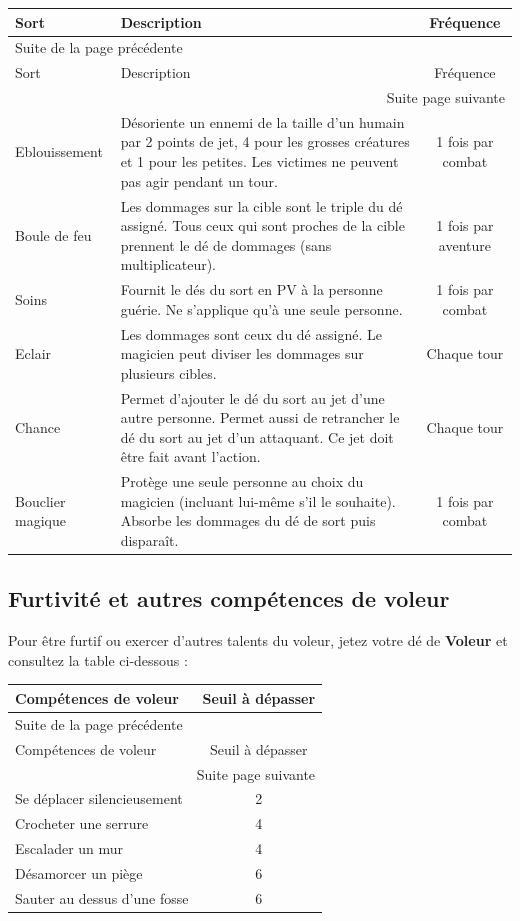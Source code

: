 \documentclass[a4paper, 11pt, twoside]{article}
\begin{document}
\begin{longtable}{l|p{10cm}|c}
Sort & Description & Fréquence\\
\hline
\endfirsthead
\multicolumn{3}{l}{Suite de la page précédente} \\
\hline

Sort & Description & Fréquence \\

\hline
\endhead
\hline\multicolumn{3}{r}{Suite page suivante} \\
\endfoot
\endlastfoot
\hline
Eblouissement & Désoriente un ennemi de la taille d'un humain par 2 points de jet, 4 pour les grosses créatures et 1 pour les petites. Les victimes ne peuvent pas agir pendant un tour. & 1 fois par combat\\
Boule de feu & Les dommages sur la cible sont le triple du dé assigné. Tous ceux qui sont proches de la cible prennent le dé de dommages (sans multiplicateur). & 1 fois par aventure\\
Soins & Fournit le dés du sort en PV à la personne guérie. Ne s'applique qu'à une seule personne. & 1 fois par combat\\
Eclair & Les dommages sont ceux du dé assigné. Le magicien peut diviser les dommages sur plusieurs cibles. & Chaque tour\\
Chance & Permet d'ajouter le dé du sort au jet d'une autre personne. Permet aussi de retrancher le dé du sort au jet d'un attaquant. Ce jet doit être fait avant l'action. & Chaque tour\\
Bouclier magique & Protège une seule personne au choix du magicien (incluant lui-même s'il le souhaite). Absorbe les dommages du dé de sort puis disparaît. & 1 fois par combat\\
\end{longtable}

\subsection{Furtivité et autres compétences de voleur}
\label{sec:orgcc8e35a}

Pour être furtif ou exercer d'autres talents du voleur, jetez votre dé de \textbf{Voleur} et consultez la table ci-dessous :

\begin{longtable}{l|c}
Compétences de voleur & Seuil à dépasser\\
\hline
\endfirsthead
\multicolumn{2}{l}{Suite de la page précédente} \\
\hline

Compétences de voleur & Seuil à dépasser \\

\hline
\endhead
\hline\multicolumn{2}{r}{Suite page suivante} \\
\endfoot
\endlastfoot
\hline
Se déplacer silencieusement & 2\\
Crocheter une serrure & 4\\
Escalader un mur & 4\\
Désamorcer un piège & 6\\
Sauter au dessus d'une fosse & 6\\
\end{longtable}
\end{document}
